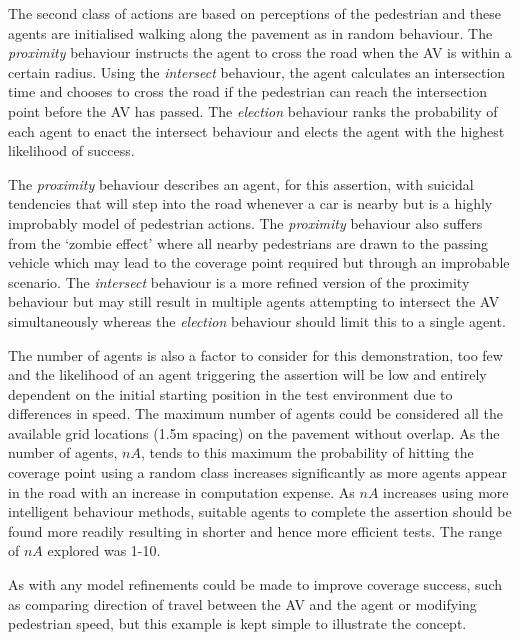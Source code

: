 \documentclass[letterpaper, 10 pt, journal, twoside]{IEEEtran}
\begin{document}
The second class of actions are based on perceptions of the pedestrian and these agents are initialised walking along the pavement as in random behaviour. The \textit{proximity} behaviour instructs the agent to cross the road when the AV is within a certain radius. Using the \textit{intersect} behaviour, the agent calculates an intersection time and chooses to cross the road if the pedestrian can reach the intersection point before the AV has passed. The \textit{election} behaviour ranks the probability of each agent to enact the intersect behaviour and elects the agent with the highest likelihood of success.

The \textit{proximity} behaviour describes an agent, for this assertion, with suicidal tendencies that will step into the road whenever a car is nearby but is a highly improbably model of pedestrian actions. The \textit{proximity} behaviour also suffers from the `zombie effect' where all nearby pedestrians are drawn to the passing vehicle which may lead to the coverage point required but through an improbable scenario. The \textit{intersect} behaviour is a more refined version of the proximity behaviour but may still result in multiple agents attempting to intersect the AV simultaneously whereas the \textit{election} behaviour should limit this to a single agent.

The number of agents is also a factor to consider for this demonstration, too few and the likelihood of an agent triggering the assertion will be low and entirely dependent on the initial starting position in the test environment due to differences in speed. The maximum number of agents could be considered all the available grid locations (1.5m spacing) on the pavement without overlap.
As the number of agents, $nA$, tends to this maximum the probability of hitting the coverage point using a random class increases significantly as more agents appear in the road with an increase in computation expense. As $nA$ increases using more intelligent behaviour methods, suitable agents to complete the assertion should be found more readily resulting in shorter and hence more efficient tests. The range of $nA$  explored was 1-10.

As with any model refinements could be made to improve coverage success, such as comparing direction of travel between the AV and the agent or modifying pedestrian speed, but this example is kept simple to illustrate the concept. 

\end{document}
